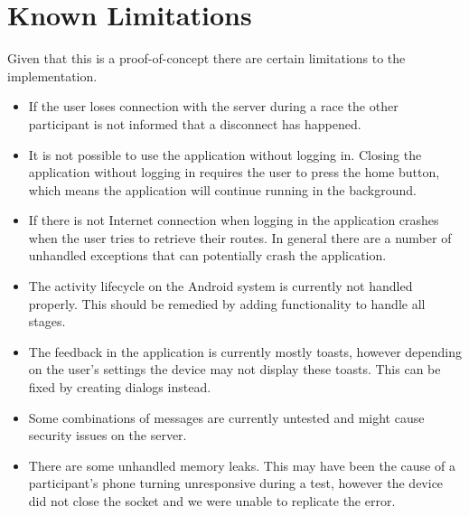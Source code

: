 \section{Known Limitations}
Given that this is a proof-of-concept there are certain limitations to the implementation.

\begin{itemize}
\item If the user loses connection with the server during a race the other participant is not informed that a disconnect has happened.
\item It is not possible to use the application without logging in. Closing the application without logging in requires the user to press the home button, which means the application will continue running in the background.
\item If there is not Internet connection when logging in the application crashes when the user tries to retrieve their routes. In general there are a number of unhandled exceptions that can potentially crash the application.
\item The activity lifecycle on the Android system is currently not handled properly. This should be remedied by adding functionality to handle all stages.
\item The feedback in the application is currently mostly toasts, however depending on the user's settings the device may not display these toasts. This can be fixed by creating dialogs instead.
\item Some combinations of messages are currently untested and might cause security issues on the server.
\item There are some unhandled memory leaks. This may have been the cause of a participant's phone turning unresponsive during a test, however the device did not close the socket and we were unable to replicate the error.
\end{itemize}

